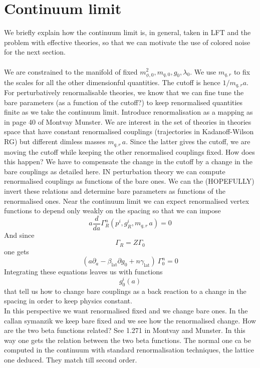 \section{Continuum limit}
\label{sec:continuum_limit}
We briefly explain how the continuum limit is, in general, taken in LFT and the problem with effective theories, so that we can motivate the use of colored noise for the next section. \\~\\
We are constrained to the manifold of fixed $m^2_{\phi, 0}, m_{q,0}, g_0, \lambda_0$. We use $m_{q,r}$ to fix the scales for all the other dimensionful quantities. The cutoff is hence $1/{m_{q,r} a}$.
For perturbatively renormalisable theories, we know that we can fine tune the bare parameters (as a function of the cutoff?) to keep renormalised quantities finite as we take the continuum limit. Introduce renormalisation as a mapping as in page 40 of Montvay Munster.
We are interest in the set of theories in theories space that have constant renormalised couplings (trajectories in Kadanoff-Wilson RG) but different dimless masses $m_{q,r} \, a$. Since the latter gives the cutoff, we are moving the cutoff while keeping the other renormalised couplings fixed. How does this happen? We have to compensate the change in the cutoff by a change in the bare couplings as detailed here. IN perturbation theory we can compute renormalised couplings as functions of the bare ones. We can the (HOPEFULLY) invert these relations and determine bare parameters as functions of the renormalised ones. Near the continuum limit we can expect renormalised vertex functions to depend only weakly on the spacing so that we can impose
\begin{equation*}
    a \frac{d}{da} \Gamma_R^n(p^i, g^i_R, m_{q,r} \, a) = 0
\end{equation*}
And since 
\begin{equation*}
    \Gamma_R = Z \Gamma_0
\end{equation*}
one gets
\begin{equation*}
    \left(a\partial_a - \beta_\text{lat} \partial g_0 + n \gamma_\text{lat}\right) \ \Gamma_0^n = 0
\end{equation*}
Integrating these equations leaves us with functions
\begin{equation*}
    g_0^i(a)
\end{equation*}
that tell us how to change bare couplings as a back reaction to a change in the spacing in order to keep physics constant. \\
In this perspective we want renormalised fixed and we change bare ones. In the callan symanzik we keep bare fixed and we see how the renormalised change. How are the two beta functions related? See 1.271 in Montvay and Munster. In this way one gets the relation between the two beta functions. The normal one ca be computed in the continuum with standard renormalisation techniques, the lattice one deduced. They match till second order.